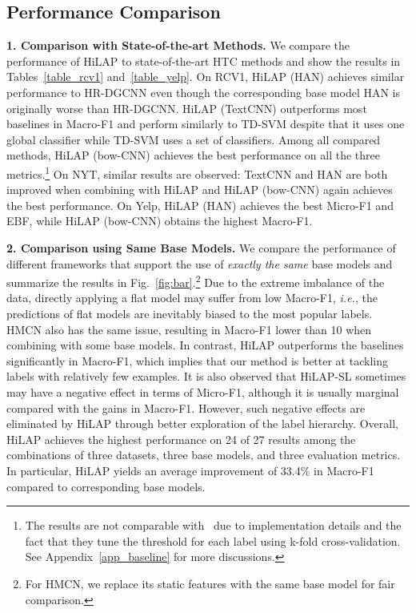 \documentclass[11pt,a4paper]{article}
\newcommand{\ie}{\textit{i.e.}} \newcommand{\eg}{\textit{e.g.}}
\begin{document}
\subsection{Performance Comparison}
\noindent
\textbf{1. Comparison with State-of-the-art Methods.}
We compare the performance of HiLAP to state-of-the-art HTC methods and show the results in Tables~\ref{table_rcv1} and~\ref{table_yelp}.
On RCV1, HiLAP (HAN) achieves similar performance to HR-DGCNN even though the corresponding base model HAN is originally worse than HR-DGCNN.
HiLAP (TextCNN) outperforms most baselines in Macro-F1 and perform similarly to TD-SVM despite that it uses one global classifier while TD-SVM uses a set of classifiers.
Among all compared methods, HiLAP (bow-CNN) achieves the best performance on all the three metrics.\footnote{The results are not comparable with~\citet{johnson2014effective} due to implementation details and the fact that they tune the threshold for each label using k-fold cross-validation. See Appendix~\ref{app_baseline} for more discussions.}
On NYT, similar results are observed:
TextCNN and HAN are both improved when combining with HiLAP and
HiLAP (bow-CNN) again achieves the best performance.
On Yelp, HiLAP (HAN) achieves the best Micro-F1 and EBF, while HiLAP (bow-CNN) obtains the highest Macro-F1.





\smallskip
\noindent
\textbf{2. Comparison using Same Base Models.}
We compare the performance of different frameworks that support the use of \textit{exactly the same} base models and summarize the results in Fig.~\ref{fig:bar}.\footnote{For HMCN, we replace its static features with the same base model for fair comparison.}
Due to the extreme imbalance of the data, directly applying a flat model may suffer from low Macro-F1, \ie, the predictions of flat models are inevitably biased to the most popular labels.
HMCN also has the same issue, resulting in Macro-F1 lower than 10 when combining with some base models.
In contrast, HiLAP outperforms the baselines significantly in Macro-F1, which implies that our method is better at tackling labels with relatively few examples.
It is also observed that HiLAP-SL sometimes may have a negative effect in terms of Micro-F1, although it is usually marginal compared with the gains in Macro-F1.
However, such negative effects are eliminated by HiLAP through better exploration of the label hierarchy.
Overall, HiLAP achieves the highest performance on 24 of 27 results among the combinations of three datasets, three base models, and three evaluation metrics.
In particular, HiLAP yields an average improvement of 33.4\% in Macro-F1 compared to corresponding base models.
\end{document}
